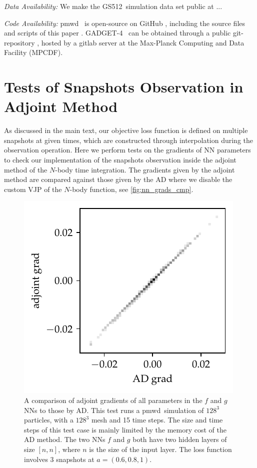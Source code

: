 \documentclass[modern, trackchanges, dvipsnames]{aastex631}
\newcommand{\pmwd}{{\usefont{T1}{nova}{m}{sl}pmwd}}
\newcommand{\GADGET}{{{\fontsize{10pt}{12pt}\selectfont GADGET}-4}}
\newcommand{\GSDATA}{{GS512}}
\begin{document}
\vspace{1em}
\textit{\large Data Availability:}
We make the \GSDATA\ simulation data set public at ...


\vspace{1em}
\textit{\large Code Availability:}
\pmwd\ \citep{Li2022b} is open-source on GitHub
\href{https://github.com/eelregit/pmwd}{\faGithub}, including the source
files and scripts of this paper
\href{https://github.com/eelregit/pmwd/tree/master/docs/papers/sto}{\faFile}.
\GADGET\ \citep{GADGET-4} can be obtained through a public
git-repository \href{http://gitlab.mpcdf.mpg.de/vrs/gadget4}{\faGitlab},
hosted by a gitlab server at the Max-Planck Computing and Data Facility
(MPCDF).







\vspace{1em}
\appendix


\vspace{1em}
\section{Tests of Snapshots Observation in Adjoint Method}
As discussed in the main text, our objective loss function is defined on
multiple snapshots at given times, which are constructed through interpolation
during the observation operation.
Here we perform tests on the gradients of NN parameters to check our
implementation of the snapshots observation inside the adjoint method of the
$N$-body time integration.
The gradients given by the adjoint method are compared against those given by
the AD where we disable the custom VJP of the $N$-body function, see
\autoref{fig:nn_grads_cmp}.

\begin{figure}
  \centering
  \includegraphics[width=0.5\linewidth]{nn_grads_cmp.pdf}
  \caption{A comparison of adjoint gradients of all parameters in the $f$ and
  $g$ NNs to those by AD.
  This test runs a \pmwd\ simulation of $128^3$ particles, with a $128^3$ mesh
  and 15 time steps.
  The size and time steps of this test case is mainly limited by the memory cost
  of the AD method.
  The two NNs $f$ and $g$ both have two hidden layers of size $[n, n]$, where
  $n$ is the size of the input layer.
  The loss function involves 3 snapshots at $a=(0.6, 0.8, 1)$.
  }
  \label{fig:nn_grads_cmp}
\end{figure}


\end{document}
